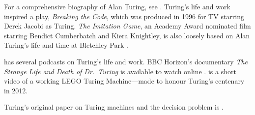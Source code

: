 \documentclass[../../../include/open-logic-section]{subfiles}
\begin{document}
\begin{reading}
For a comprehensive biography of Alan Turing, see \cite{Hodges2014}.
Turing's life and work inspired a play, \emph{Breaking the Code},
which was produced in 1996 for TV starring Derek Jacobi as
Turing. \emph{The Imitation Game}, an Academy Award nominated film
starring Bendict Cumberbatch and Kiera Knightley, is also loosely
based on Alan Turing's life and time at Bletchley Park
\cite{Imitation2014}.

\cite{Radiolab2012} has several podcasts on Turing's life and work.
BBC Horizon's documentary \emph{The Strange Life and Death of
  Dr.~Turing} is available to watch online \cite{Sykes1992}.
\cite{Theelen2012} is a short video of a working LEGO Turing
Machine---made to honour Turing's centenary in 2012.

Turing's original paper on Turing machines and the decision problem is
\cite{Turing1937}.
\end{reading}
\end{document}
